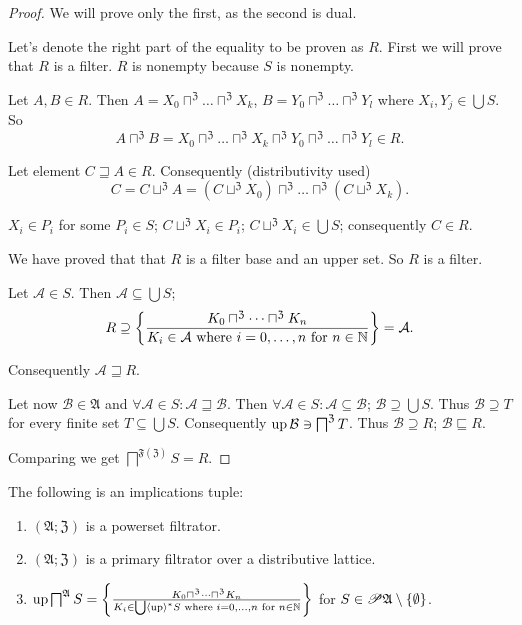 \begin{proof}
We will prove only the first, as the second is dual.

Let's denote the right part of the equality to be proven as $R$.
First we will prove that $R$ is a filter. $R$ is nonempty because
$S$ is nonempty.

Let $A,B\in R$. Then $A=X_{0}\sqcap^{\mathfrak{Z}}\dots\sqcap^{\mathfrak{Z}}X_{k}$,
$B=Y_{0}\sqcap^{\mathfrak{Z}}\dots\sqcap^{\mathfrak{Z}}Y_{l}$ where
$X_{i},Y_{j}\in\bigcup S$. So
\[
A\sqcap^{\mathfrak{Z}}B=X_{0}\sqcap^{\mathfrak{Z}}\dots\sqcap^{\mathfrak{Z}}X_{k}\sqcap^{\mathfrak{Z}}Y_{0}\sqcap^{\mathfrak{Z}}\dots\sqcap^{\mathfrak{Z}}Y_{l}\in R.
\]



Let element $C\sqsupseteq A\in R$. Consequently (distributivity used)
\[
C=C\sqcup^{\mathfrak{Z}}A=(C\sqcup^{\mathfrak{Z}}X_{0})\sqcap^{\mathfrak{Z}}\dots\sqcap^{\mathfrak{Z}}(C\sqcup^{\mathfrak{Z}}X_{k}).
\]



$X_{i}\in P_{i}$ for some $P_{i}\in S$; $C\sqcup^{\mathfrak{Z}}X_{i}\in P_{i}$;
$C\sqcup^{\mathfrak{Z}}X_{i}\in\bigcup S$; consequently $C\in R$.


We have proved that that $R$ is a filter base and an upper set. So
$R$ is a filter.


Let $\mathcal{A}\in S$. Then $\mathcal{A}\subseteq\bigcup S$;
\[
R\supseteq\left\{ \frac{K_{0}\sqcap^{\mathfrak{Z}}\dots\sqcap^{\mathfrak{Z}}K_{n}}{K_{i}\in\mathcal{A}\text{ where }i=0,\dots,n\text{ for }n\in\mathbb{N}}\right\}=\mathcal{A}.
\]



Consequently $\mathcal{A}\sqsupseteq R$.


Let now $\mathcal{B}\in\mathfrak{A}$ and $\forall\mathcal{A}\in S:\mathcal{A}\sqsupseteq\mathcal{B}$.
Then $\forall\mathcal{A}\in S:\mathcal{A}\subseteq\mathcal{B}$; $\mathcal{B}\supseteq\bigcup S$.
Thus $\mathcal{B}\supseteq T$ for every finite set $T\subseteq\bigcup S$.
Consequently $\operatorname{up}\mathcal{B}\ni\bigsqcap^{\mathfrak{Z}}T$. Thus $\mathcal{B}\supseteq R$;
$\mathcal{B}\sqsubseteq R$.


Comparing we get $\bigsqcap^{\mathfrak{F}(\mathfrak{Z})}S=R$.

\end{proof}
\begin{cor}
\label{f-inf-meet-form}The following is an implications tuple:
\begin{enumerate}
\item \label{inf-meet-form-p}$(\mathfrak{A};\mathfrak{Z})$ is a powerset
filtrator.
\item \label{inf-meet-form-fltr}$(\mathfrak{A};\mathfrak{Z})$ is a primary
filtrator over a distributive lattice.
\item \label{inf-meet-form-conc}$\operatorname{up}\bigsqcap^{\mathfrak{A}}S=\left\{ \frac{K_{0}\sqcap^{\mathfrak{Z}}\dots\sqcap^{\mathfrak{Z}}K_{n}}{K_{i}\in\bigcup\left\langle \operatorname{up}\right\rangle ^{\ast}S\text{ where }i=0,\dots,n\text{ for }n\in\mathbb{N}}\right\}$
for $S\in\mathscr{P}\mathfrak{A}\setminus\{\emptyset\}$.
\end{enumerate}
\end{cor}
